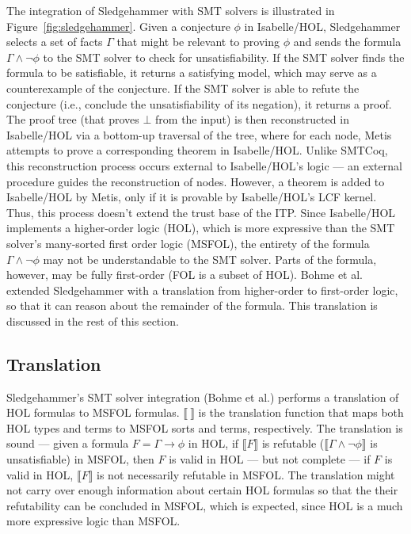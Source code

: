 \documentclass[11pt]{article}
\begin{document}
	The integration of Sledgehammer 
	with SMT solvers is illustrated in 
	Figure~\ref{fig:sledgehammer}. Given 
	a conjecture $\phi$ in 
	Isabelle/HOL, Sledgehammer 
	selects a set of facts 
	$\Gamma$ that might be relevant 
	to proving $\phi$ and sends
	the formula $\Gamma \land \neg 
	\phi$ to the SMT solver to check 
	for unsatisfiability. If the SMT 
	solver finds the formula to be 
	satisfiable, it returns a satisfying 
	model, which may serve as a 
	counterexample 
	of the conjecture. If the SMT 
	solver is able to refute the 
	conjecture (i.e., conclude 
	the unsatisfiability of its 
	negation), it returns 
	a proof. The proof tree (that
	proves $\bot$ from the 
	input) is then reconstructed in 
	Isabelle/HOL via a bottom-up 
	traversal of the tree, where 
	for each node, Metis attempts 
	to prove a corresponding theorem
	in Isabelle/HOL.
	Unlike SMTCoq, this reconstruction
	process occurs external to 
	Isabelle/HOL's logic ---
	an external procedure guides 
	the reconstruction of nodes. 
	However, a theorem is added to 
	Isabelle/HOL by Metis, only if it 
	is provable by Isabelle/HOL's LCF 
	kernel. Thus, this process doesn't
	extend the trust base of the ITP.
	Since Isabelle/HOL 
	implements a higher-order logic 
	(HOL), which 
	is more expressive than 
	the SMT solver's many-sorted
	first order logic (MSFOL),
	the entirety of the formula
	$\Gamma \land \neg \phi$ may not 
	be understandable to the SMT 
	solver. Parts of the formula,
	however, may be fully 
	first-order (FOL is 
	a subset of HOL). Bohme et al.
	extended Sledgehammer with 
	a translation from higher-order 
	to first-order logic, so that 
	it can reason about the remainder
	of the formula. This translation
	is discussed in the rest of this 
	section.
	
	\subsection{Translation}
	\label{sec:trans}
	Sledgehammer's SMT solver 
	integration (Bohme et al.) performs 
	a translation 
	of HOL formulas to MSFOL formulas.
	$\llbracket\ \rrbracket$
	is the translation function 
	that maps both HOL types and 
	terms to MSFOL sorts and terms,
	respectively.
	The translation is sound --- 
	given a formula 
	$F = \Gamma \to \phi$ in HOL, if 
	$\llbracket F \rrbracket$ is refutable 
	($\llbracket \Gamma \land \neg
	\phi \rrbracket$
	is unsatisfiable) in MSFOL, then 
	$F$	is valid in HOL --- but not 
	complete --- if $F$ is valid in 
	HOL, $\llbracket F \rrbracket$ is 
	not necessarily refutable in MSFOL. 
	The translation might not carry over 
	enough information about certain HOL 
	formulas so that the their 
	refutability can be concluded in 
	MSFOL, which is	expected, since HOL 
	is a much more expressive logic than 
	MSFOL. 
	
\end{document}
